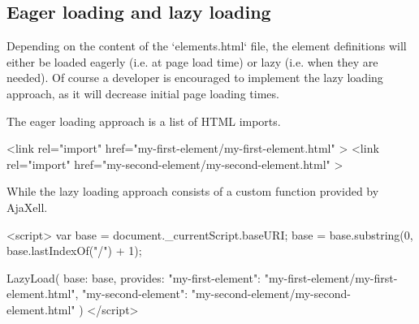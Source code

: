 \subsection{Eager loading and lazy loading}
Depending on the content of the `elements.html` file, the element definitions
will either be loaded eagerly (i.e. at page load time) or lazy (i.e. when they
are needed). Of course a developer is encouraged to implement the lazy loading
approach, as it will decrease initial page loading times.

The eager loading approach is a list of HTML imports.
\begin{pyglist}[language=html,numbers=left,numbersep=5pt,fontsize=\small]
<link rel="import" href="my-first-element/my-first-element.html" >
<link rel="import" href="my-second-element/my-second-element.html" >
\end{pyglist}

While the lazy loading approach consists of a custom function provided by AjaXell.
\begin{pyglist}[language=html,numbers=left,numbersep=5pt,fontsize=\small]
<script>
var base = document._currentScript.baseURI;
base = base.substring(0, base.lastIndexOf("/") + 1);

LazyLoad({
  base: base,
  provides: {
    "my-first-element": "my-first-element/my-first-element.html",
    "my-second-element": "my-second-element/my-second-element.html"
  }
})
</script>
\end{pyglist}
